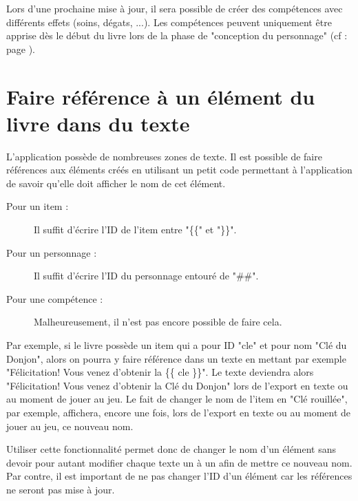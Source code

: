 		Lors d'une prochaine mise à jour, il sera possible de créer des compétences avec différents effets (soins, dégats, ...). Les compétences peuvent uniquement être apprise dès le début du livre lors de la phase de "conception du personnage" (cf :   page \pageref{subsubsec:persoCreationSkill}).

	\section{Faire référence à un élément du livre dans du texte}

		L'application possède de nombreuses zones de texte. Il est possible de faire références aux éléments créés en utilisant un petit code permettant à l'application de savoir qu'elle doit afficher le nom de cet élément.

		\begin{description}
			\item[Pour un item : ]{Il suffit d'écrire l'ID de l'item entre "\{\{" et "\}\}".}
			\item[Pour un personnage : ]{Il suffit d'écrire l'ID du personnage entouré de "\#\#".}
			\item[Pour une compétence : ]{Malheureusement, il n'est pas encore possible de faire cela.}
		\end{description}

		Par exemple, si le livre possède un item qui a pour ID "cle" et pour nom "Clé du Donjon", alors on pourra y faire référence dans un texte en mettant par exemple "Félicitation! Vous venez d'obtenir la \{\{ cle \}\}". Le texte deviendra alors "Félicitation! Vous venez d'obtenir la Clé du Donjon" lors de l'export en texte ou au moment de jouer au jeu. Le fait de changer le nom de l'item en "Clé rouillée", par exemple, affichera, encore une fois, lors de l'export en texte ou au moment de jouer au jeu, ce nouveau nom.

		Utiliser cette fonctionnalité permet donc de changer le nom d'un élément sans devoir pour autant modifier chaque texte un à un afin de mettre ce nouveau nom. Par contre, il est important de ne pas changer l'ID d'un élément car les références ne seront pas mise à jour.
